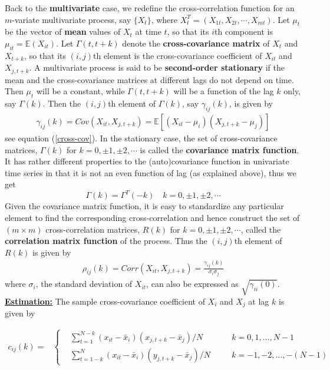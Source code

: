 Back to the \textbf{multivariate} case, we redefine the cross-correlation function for an $m$-variate multivariate process, say $\{X_t\}$, where $X_t^T=(X_{1t},X_{2t},\cdots,X_{mt})$. Let $\mu_t$ be the vector of \textbf{mean} values of $X_t$ at time $t$, so that its $i$th component is $\mu_{it}=\mathbb{E}(X_{it})$. Let $\Gamma(t,t+k)$ denote the \textbf{cross-covariance matrix} of $X_t$ and $X_{t+k}$, so that its $(i,j)$th element is the cross-covariance coefficient of $X_{it}$ and $X_{j,t+k}$. A multivariate process is said to be \textbf{second-order stationary} if the mean and the cross-covariance matrices at different lags do not depend on time. Then $\mu_t$ will be a constant, while $\Gamma(t,t+k)$ will be a function of the lag $k$ only, say $\Gamma(k)$. Then the $(i,j)$th element of $\Gamma(k)$, say $\gamma_{ij}(k)$, is given by 
\begin{align}
    \gamma_{ij}(k)=Cov(X_{it},X_{j,t+k})= \mathbb{E}[(X_{it}-\mu_i)(X_{j,t+k}-\mu_j)]
\end{align}
see equation (\ref{cross-cov}). In the stationary case, the set of cross-covariance matrices, $\Gamma(k)$ for $k=0,\pm 1,\pm 2,\cdots$ is called the \textbf{covariance matrix function}. \\
It has rather different properties to the (auto)covariance function in univariate time series in that it is not an even function of lag (as explained above), thus we get \[
\Gamma(k)=\Gamma^T(-k) \quad k=0,\pm1,\pm2,\cdots
\]
Given the covariance matrix function, it is easy to standardize any particular element to find the corresponding cross-correlation and hence construct the set of $(m\times m)$ cross-correlation matrices, $R(k)$ for $k=0,\pm1,\pm2,\cdots$, called the \textbf{correlation matrix function} of the process. Thus the $(i,j)$th element of $R(k)$ is given by 
\begin{align}
    \rho_{ij}(k)=Corr(X_{it},X_{j,t+k})= \frac{\gamma_{ij}(k)}{\sigma_i \sigma_j}
\end{align}
\quad where $\sigma_i$, the standard deviation of $X_{it}$, can also be expressed as $\sqrt{\gamma_{ii}(0)}$.\\

\noindent
\textbf{\underline{Estimation:}} The sample cross-covariance coefficient of $X_i$ and $X_j$ at lag $k$ is given by

\begin{equation}
\begin{split}
c_{ij}(k) = & \left\{
\begin{aligned}
    &\sum_{t=1}^{N-k} (x_{it} - \bar{x}_i)(x_{j,t+k} - \bar{x}_j)/N & \quad & k = 0, 1, \ldots, N-1 \\
    &\sum_{t=1-k}^{N} (x_{it} - \bar{x}_i)(y_{j,t+k} - \bar{x}_j)/N & \quad & k = -1, -2, \ldots, -(N-1)
\end{aligned}
\right.
\end{split}
\end{equation}

